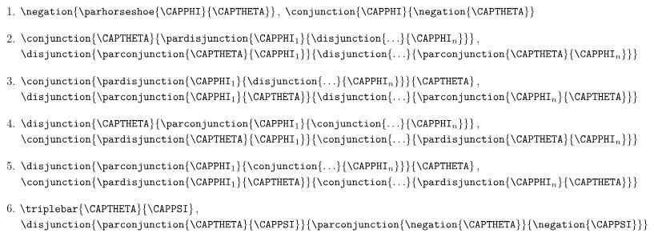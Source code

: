 \begin{enumerate}
\item $\negation{\parhorseshoe{\CAPPHI}{\CAPTHETA}}$, $\conjunction{\CAPPHI}{\negation{\CAPTHETA}}$

 
\item $\conjunction{\CAPTHETA}{\pardisjunction{\CAPPHI_1}{\disjunction{\ldots}{\CAPPHI_{\integer{n}}}}}$, $\disjunction{\parconjunction{\CAPTHETA}{\CAPPHI_1}}{\disjunction{\ldots}{\parconjunction{\CAPTHETA}{\CAPPHI_{\integer{n}}}}}$

 

\item $\conjunction{\pardisjunction{\CAPPHI_1}{\disjunction{\ldots}{\CAPPHI_{\integer{n}}}}}{\CAPTHETA}$, $\disjunction{\parconjunction{\CAPPHI_1}{\CAPTHETA}}{\disjunction{\ldots}{\parconjunction{\CAPPHI_{\integer{n}}}{\CAPTHETA}}}$
 
 
 
\item $\disjunction{\CAPTHETA}{\parconjunction{\CAPPHI_1}{\conjunction{\ldots}{\CAPPHI_{\integer{n}}}}}$, $\conjunction{\pardisjunction{\CAPTHETA}{\CAPPHI_1}}{\conjunction{\ldots}{\pardisjunction{\CAPTHETA}{\CAPPHI_{\integer{n}}}}}$
 

\item $\disjunction{\parconjunction{\CAPPHI_1}{\conjunction{\ldots}{\CAPPHI_{\integer{n}}}}}{\CAPTHETA}$, $\conjunction{\pardisjunction{\CAPPHI_1}{\CAPTHETA}}{\conjunction{\ldots}{\pardisjunction{\CAPPHI_{\integer{n}}}{\CAPTHETA}}}$


\item $\triplebar{\CAPTHETA}{\CAPPSI}$, $\disjunction{\parconjunction{\CAPTHETA}{\CAPPSI}}{\parconjunction{\negation{\CAPTHETA}}{\negation{\CAPPSI}}}$

\end{enumerate}

